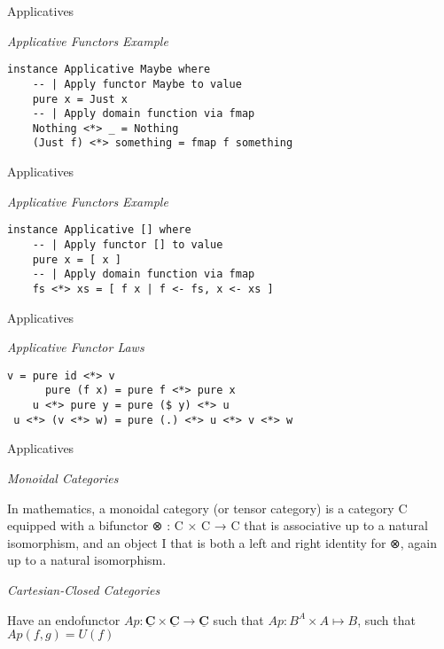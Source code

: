 \documentclass[10pt]{beamer}
\newcommand{\Cat}[1]{\ensuremath{\underline{\mathbf{#1}}}}
\theoremstyle{definition}
\theoremstyle{remark}
\numberwithin{equation}{section}
\begin{document}
\begin{frame}[fragile]{Applicatives}

  \emph{Applicative Functors Example}

  \begin{lstlisting}[frame=single]
instance Applicative Maybe where
    -- | Apply functor Maybe to value
    pure x = Just x
    -- | Apply domain function via fmap
    Nothing <*> _ = Nothing
    (Just f) <*> something = fmap f something
  \end{lstlisting}

\end{frame}

\begin{frame}[fragile]{Applicatives}

  \emph{Applicative Functors Example}

  \begin{lstlisting}[frame=single]
instance Applicative [] where
    -- | Apply functor [] to value
    pure x = [ x ]
    -- | Apply domain function via fmap
    fs <*> xs = [ f x | f <- fs, x <- xs ]
  \end{lstlisting}

\end{frame}

\begin{frame}[fragile]{Applicatives}

  \emph{Applicative Functor Laws}

  \begin{lstlisting}[frame=single]
               v = pure id <*> v
      pure (f x) = pure f <*> pure x
    u <*> pure y = pure ($ y) <*> u
 u <*> (v <*> w) = pure (.) <*> u <*> v <*> w
  \end{lstlisting}

\end{frame}

\begin{frame}[fragile]{Applicatives}

  \emph{Monoidal Categories}

  In mathematics, a monoidal category (or tensor category) is a category C equipped with a bifunctor
⊗ : C × C → C
  that is associative up to a natural isomorphism, and an object I that is both a left and right identity for ⊗, again up to a natural isomorphism.

  \emph{Cartesian-Closed Categories}

  Have an endofunctor $Ap : \Cat{C}\times\Cat{C} \rightarrow \Cat{C}$ such that $Ap : B^A \times A \mapsto B$, such that $ Ap(f,g) = U(f)$

\end{frame}
\end{document}
